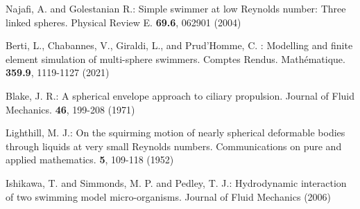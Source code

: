\documentclass[graybox]{svmult}
\begin{document}
\begin{thebibliography}{99.}
Najafi, A. and Golestanian R.: Simple swimmer at low Reynolds number: Three linked spheres. Physical Review E. \textbf{69.6}, 062901 (2004)

Berti, L., Chabannes, V., Giraldi, L., and Prud'Homme, C. : Modelling and finite element simulation of multi-sphere swimmers. Comptes Rendus. Mathématique. \textbf{359.9}, 1119-1127 (2021)


Blake, J. R.: A spherical envelope approach to ciliary propulsion. Journal of Fluid Mechanics. \textbf{46}, 199-208 (1971)

Lighthill, M. J.: On the squirming motion of nearly spherical deformable bodies through liquids at very small Reynolds numbers. Communications on pure and applied mathematics. \textbf{5}, 109-118 (1952) 

Ishikawa, T. and Simmonds, M. P. and Pedley, T. J.: Hydrodynamic interaction of two swimming model micro-organisms. Journal of Fluid Mechanics (2006)
\end{thebibliography}
\end{document}
